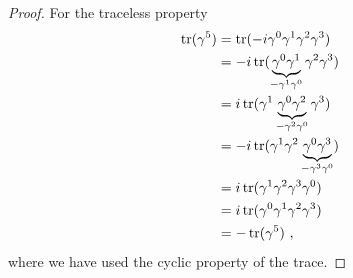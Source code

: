 \begin{proof}
        For the traceless property 
        \begin{equation*}
        \begin{aligned}
            \operatorname{tr} (\gamma^5) & = \operatorname{tr}(-i \gamma^0 \gamma^1 \gamma^2 \gamma^3) \\ & = - i \operatorname{tr} (\underbrace{\gamma^0 \gamma^1}_{- \gamma^1 \gamma^0} \gamma^2 \gamma^3)\\ &  = i \operatorname{tr}(\gamma^1 \underbrace{\gamma^0 \gamma^2}_{- \gamma^2 \gamma^0} \gamma^3)\\ &  = - i \operatorname{tr} (\gamma^1 \gamma^2 \underbrace{\gamma^0 \gamma^3}_{- \gamma^3 \gamma^0}) \\ & = i \operatorname{tr} (\gamma^1 \gamma^2 \gamma^3 \gamma^0) \\ & = i \operatorname{tr} ( \gamma^0 \gamma^1 \gamma^2 \gamma^3) \\ & = - \operatorname{tr} (\gamma^5) ~,
        \end{aligned}        
        \end{equation*}
        where we have used the cyclic property of the trace.
    \end{proof}

